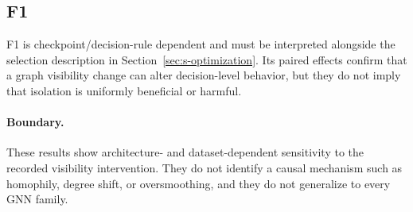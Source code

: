 \subsection{F1}



F1 is checkpoint/decision-rule dependent and must be interpreted alongside the selection description in Section~\ref{sec:s-optimization}. Its paired effects confirm that a graph visibility change can alter decision-level behavior, but they do not imply that isolation is uniformly beneficial or harmful.

\paragraph{Boundary.}
These results show architecture- and dataset-dependent sensitivity to the recorded visibility intervention. They do not identify a causal mechanism such as homophily, degree shift, or oversmoothing, and they do not generalize to every GNN family.
